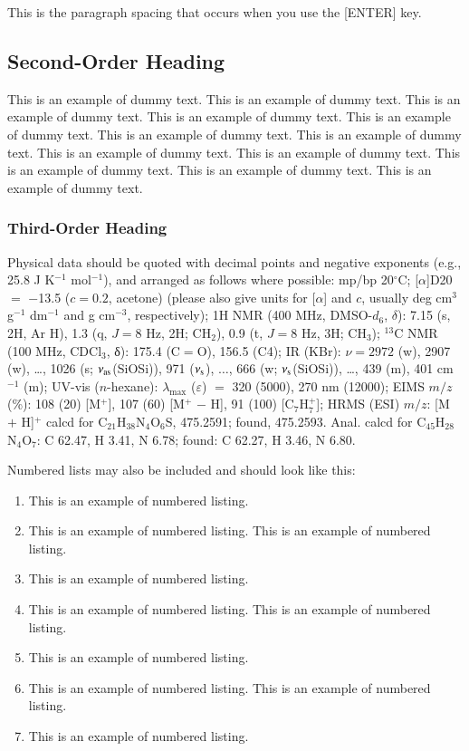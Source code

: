 \documentclass{aip-cp}
\begin{document}
This is the paragraph spacing that occurs when you use the [ENTER] key.

\subsection{Second-Order Heading}
This is an example of dummy text. This is an example of dummy text. This is an example of dummy text.
This is an example of dummy text. This is an example of dummy text. This is an example of dummy text.
This is an example of dummy text. This is an example of dummy text. This is an example of dummy text.
This is an example of dummy text. This is an example of dummy text. This is an example of dummy text.


\subsubsection{Third-Order Heading}
Physical data should be quoted with decimal points and negative exponents (e.g., 25.8 J K$^{-1}$ mol$^{-1}$), and arranged as follows where possible: mp/bp 20$^{\circ}$C; [$\alpha$]D20 $=$ $-$13.5 ($c = 0.2$, acetone) (please also give units for [$\alpha$] and $c$, usually deg cm$^3$ g$^{-1}$ dm$^{-1}$ and g cm$^{-3}$, respectively); 1H NMR (400 MHz, DMSO-$d_6$, $\delta$): 7.15 (s, 2H, Ar H), 1.3 (q, $J = 8$ Hz, 2H; CH$_2$), 0.9 (t, $J = 8$ Hz, 3H; CH$_3$); $^{13}$C NMR (100 MHz, CDCl$_3$, δ): 175.4 (C$=$O), 156.5 (C4); IR (KBr): $\nu = 2972$ (w), 2907 (w), \ldots, 1026 (s; $\nu_{\rm as}$(SiOSi)), 971 ($\nu_{\rm s}$), $\ldots$, 666 (w; $\nu_{\rm s}$(SiOSi)), \ldots, 439 (m), 401 cm$^{-1}$ (m); UV-vis ($n$-hexane): $\lambda_{\max}$ ($\varepsilon$) $=$ 320 (5000), 270 nm (12000); EIMS $m/z$ (\%): 108 (20) [M$^+$], 107 (60) [M$^+$ $-$ H], 91 (100) [C$_7$H$_7^+$]; HRMS (ESI) $m/z$: [M $+$ H]$^+$ calcd for C$_{21}$H$_{38}$N$_{4}$O$_{6}$S, 475.2591; found, 475.2593. Anal. calcd for C$_{45}$H$_{28}$N$_{4}$O$_{7}$: C 62.47, H 3.41, N 6.78; found: C 62.27, H 3.46, N 6.80.

\noindent Numbered lists may also be included and should look like this:

\begin{enumerate}
\item This is an example of numbered listing.
\item This is an example of numbered listing. This is an example of numbered listing.
\item This is an example of numbered listing.
\item This is an example of numbered listing. This is an example of numbered listing.
\item This is an example of numbered listing.
\item This is an example of numbered listing. This is an example of numbered listing.
\item This is an example of numbered listing.
\end{enumerate}
\end{document}
